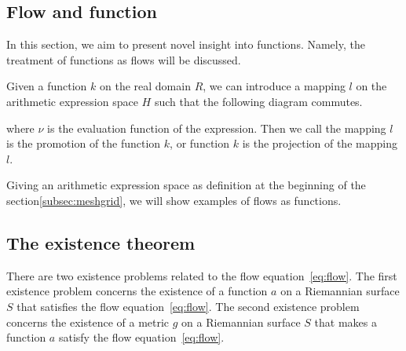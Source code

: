 \subsection{Flow and function}\label{subsec:flow-and-function}

In this section, we aim to present novel insight into functions.
Namely, the treatment of functions as flows will be discussed.

\begin{definition}\label{def:projection}
Given a function $k$ on the real domain $R$, we can introduce a mapping $l$ on the arithmetic expression space $H$ such that the following diagram commutes.

\begin{center}
\end{center}

where $\nu$ is the evaluation function of the expression. Then we call the mapping $l$ is the promotion of the function $k$,
or function $k$ is the projection of the mapping $l$.
\end{definition}

Giving an arithmetic expression space as definition at the beginning of the section\ref{subsec:meshgrid},
we will show examples of flows as functions.

%
%

\subsection{The existence theorem}\label{subsec:existence-theorem}

There are two existence problems related to the flow equation~\eqref{eq:flow}.
The first existence problem concerns the existence of a function $a$ on a Riemannian surface $S$ that satisfies the flow equation~\eqref{eq:flow}.
The second existence problem concerns the existence of a metric $g$ on a Riemannian surface $S$ that makes a function $a$ satisfy the flow equation~\eqref{eq:flow}.


